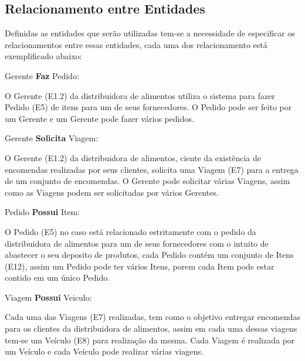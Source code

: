 \documentclass[12pt, onecolumn, titlepage]{article}
\begin{document}
\subsection{Relacionamento entre Entidades}
\label{sect:relacionamento}

Definidas as entidades que serão utilizadas tem-se a necessidade de especificar os relacionamentos entre essas entidades, cada uma dos relacionamento está exemplificado abaixo:

\begin{description}

\item Gerente \textbf{Faz} Pedido: 
\item \qquad O Gerente (E1.2) da distribuidora de alimentos utiliza o sistema para fazer Pedido (E5) de itens para um de seus fornecedores. O Pedido pode ser feito por um Gerente e um Gerente pode fazer vários pedidos.


\item Gerente \textbf{Solicita} Viagem: 
\item \qquad O Gerente (E1.2) da distribuidora de alimentos, ciente da existência de encomendas realizadas por seus clientes, solicita uma Viagem (E7) para a entrega de um conjunto de encomendas. O Gerente pode solicitar várias Viagens, assim como as Viagens podem ser solicitadas por vários Gerentes.

\item Pedido \textbf{Possui} Item: 
\item \qquad O Pedido (E5) no caso está relacionado estritamente com o pedido da distribuidora de alimentos para um de seus fornecedores com o intuito de abastecer o seu deposito de produtos, cada Pedido contém um conjunto de Itens (E12), assim um Pedido pode ter vários Itens, porem cada Item pode estar contido em um único Pedido.

\item Viagem \textbf{Possui} Veiculo: 
\item \qquad Cada uma das Viagens (E7) realizadas, tem como o objetivo entregar encomendas para os clientes da distribuidora de alimentos, assim em cada uma dessas viagens tem-se um Veículo (E8) para realização da mesma. Cada Viagem é realizada por um Veículo e cada Veículo pode realizar várias viagens.


\end{description}
\end{document}
